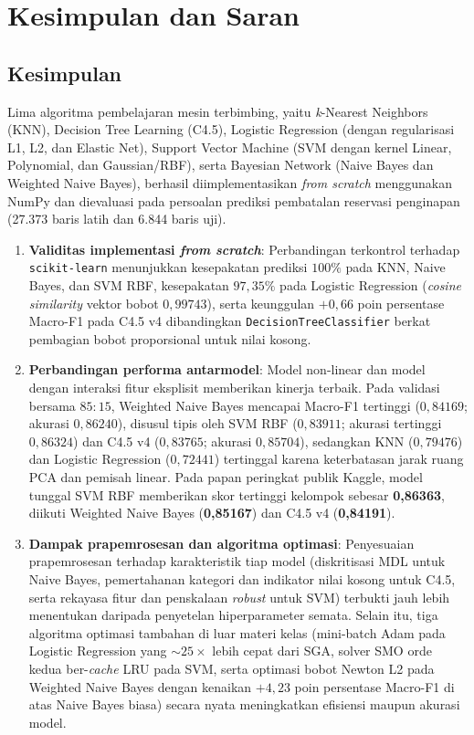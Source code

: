 \section{Kesimpulan dan Saran}
\sloppy

\subsection{Kesimpulan}

Lima algoritma pembelajaran mesin terbimbing, yaitu \textit{k}-Nearest Neighbors (KNN),
Decision Tree Learning (C4.5), Logistic Regression (dengan regularisasi L1, L2, dan
Elastic Net), Support Vector Machine (SVM dengan kernel Linear, Polynomial, dan Gaussian/RBF),
serta Bayesian Network (Naive Bayes dan Weighted Naive Bayes), berhasil diimplementasikan
\textit{from scratch} menggunakan NumPy dan dievaluasi pada persoalan prediksi pembatalan
reservasi penginapan (27.373 baris latih dan 6.844 baris uji).

\begin{enumerate}
  \item \textbf{Validitas implementasi \textit{from scratch}}: Perbandingan terkontrol terhadap
        \texttt{scikit-learn} menunjukkan kesepakatan prediksi $100\%$ pada KNN, Naive Bayes,
        dan SVM RBF, kesepakatan $97{,}35\%$ pada Logistic Regression (\textit{cosine similarity}
        vektor bobot $0{,}99743$), serta keunggulan $+0{,}66$ poin persentase Macro-F1 pada C4.5 v4
        dibandingkan \texttt{DecisionTreeClassifier} berkat pembagian bobot proporsional untuk nilai kosong.
  \item \textbf{Perbandingan performa antarmodel}: Model non-linear dan model dengan interaksi fitur
        eksplisit memberikan kinerja terbaik. Pada validasi bersama $85:15$, Weighted Naive Bayes mencapai
        Macro-F1 tertinggi ($0{,}84169$; akurasi $0{,}86240$), disusul tipis oleh SVM RBF ($0{,}83911$;
        akurasi tertinggi $0{,}86324$) dan C4.5 v4 ($0{,}83765$; akurasi $0{,}85704$), sedangkan KNN
        ($0{,}79476$) dan Logistic Regression ($0{,}72441$) tertinggal karena keterbatasan jarak ruang
        PCA dan pemisah linear. Pada papan peringkat publik Kaggle, model tunggal SVM RBF memberikan
        skor tertinggi kelompok sebesar \textbf{0,86363}, diikuti Weighted Naive Bayes (\textbf{0,85167})
        dan C4.5 v4 (\textbf{0,84191}).
  \item \textbf{Dampak prapemrosesan dan algoritma optimasi}: Penyesuaian prapemrosesan terhadap
        karakteristik tiap model (diskritisasi MDL untuk Naive Bayes, pemertahanan kategori dan indikator
        nilai kosong untuk C4.5, serta rekayasa fitur dan penskalaan \textit{robust} untuk SVM) terbukti
        jauh lebih menentukan daripada penyetelan hiperparameter semata. Selain itu, tiga algoritma
        optimasi tambahan di luar materi kelas (mini-batch Adam pada Logistic Regression yang $\sim 25\times$
        lebih cepat dari SGA, solver SMO orde kedua ber-\textit{cache} LRU pada SVM, serta optimasi bobot
        Newton L2 pada Weighted Naive Bayes dengan kenaikan $+4{,}23$ poin persentase Macro-F1 di atas
        Naive Bayes biasa) secara nyata meningkatkan efisiensi maupun akurasi model.
\end{enumerate}

